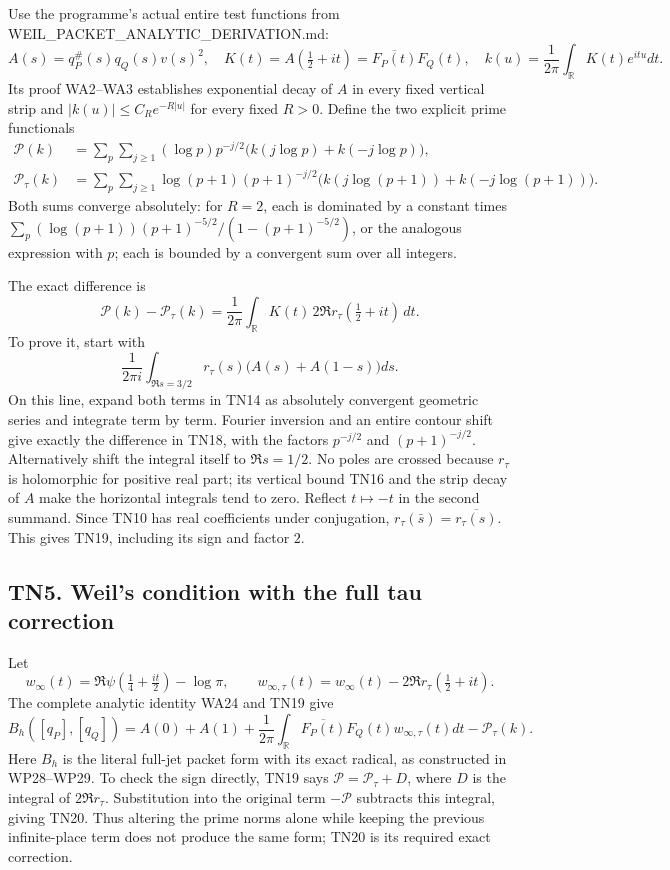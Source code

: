 \documentclass[
  10pt,
  a4paper,
]{article}
\begin{document}
Use the programme's actual entire test functions from
WEIL\_PACKET\_ANALYTIC\_DERIVATION.md: \[
A(s)=q_P^\#(s)q_Q(s)v(s)^2,\quad
K(t)=A(\tfrac12+it)=\overline{F_P(t)}F_Q(t),\quad
k(u)=\frac1{2\pi}\int_{\mathbb R}K(t)e^{itu}dt.
\tag{TN17}
\] Its proof WA2--WA3 establishes exponential decay of \(A\) in every
fixed vertical strip and \(|k(u)|\le C_R e^{-R|u|}\) for every fixed
\(R>0\). Define the two explicit prime functionals \[
\begin{aligned}
\mathcal P(k)&=\sum_p\sum_{j\ge1}(\log p)p^{-j/2}
\bigl(k(j\log p)+k(-j\log p)\bigr),\\
\mathcal P_\tau(k)&=\sum_p\sum_{j\ge1}\log(p+1)(p+1)^{-j/2}
\bigl(k(j\log(p+1))+k(-j\log(p+1))\bigr).
\end{aligned}
\tag{TN18}
\] Both sums converge absolutely: for \(R=2\), each is dominated by a
constant times \(\sum_p(\log(p+1))(p+1)^{-5/2}/(1-(p+1)^{-5/2})\), or
the analogous expression with \(p\); each is bounded by a convergent sum
over all integers.

The exact difference is \[
\boxed{\mathcal P(k)-\mathcal P_\tau(k)
=\frac1{2\pi}\int_{\mathbb R}K(t)
\,2\Re r_\tau(\tfrac12+it)\,dt.}
\tag{TN19}
\] To prove it, start with \[
\frac1{2\pi i}\int_{\Re s=3/2}
r_\tau(s)\bigl(A(s)+A(1-s)\bigr)ds.
\] On this line, expand both terms in TN14 as absolutely convergent
geometric series and integrate term by term. Fourier inversion and an
entire contour shift give exactly the difference in TN18, with the
factors \(p^{-j/2}\) and \((p+1)^{-j/2}\). Alternatively shift the
integral itself to \(\Re s=1/2\). No poles are crossed because
\(r_\tau\) is holomorphic for positive real part; its vertical bound
TN16 and the strip decay of \(A\) make the horizontal integrals tend to
zero. Reflect \(t\mapsto-t\) in the second summand. Since TN10 has real
coefficients under conjugation, \(r_\tau(\bar s)=\overline{r_\tau(s)}\).
This gives TN19, including its sign and factor \(2\).

\subsection{TN5. Weil's condition with the full tau
correction}\label{tn5.-weils-condition-with-the-full-tau-correction}

Let \[
w_\infty(t)=\Re\psi(\tfrac14+\tfrac{it}2)-\log\pi,
\qquad
w_{\infty,\tau}(t)=w_\infty(t)-2\Re r_\tau(\tfrac12+it).
\tag{TN20}
\] The complete analytic identity WA24 and TN19 give \[
\boxed{B_h([q_P],[q_Q])
=A(0)+A(1)
+\frac1{2\pi}\int_{\mathbb R}\overline{F_P(t)}F_Q(t)
w_{\infty,\tau}(t)dt
-\mathcal P_\tau(k).}
\tag{TN21}
\] Here \(B_h\) is the literal full-jet packet form with its exact
radical, as constructed in WP28--WP29. To check the sign directly, TN19
says \(\mathcal P=\mathcal P_\tau+D\), where \(D\) is the integral of
\(2\Re r_\tau\). Substitution into the original term \(-\mathcal P\)
subtracts this integral, giving TN20. Thus altering the prime norms
alone while keeping the previous infinite-place term does not produce
the same form; TN20 is its required exact correction.
\end{document}

